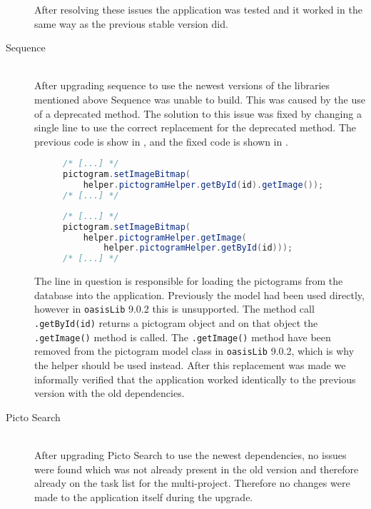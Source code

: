 \begin{description}
     After resolving these issues the application was tested and it worked in the same way as the previous stable version did. 
     \item[Sequence] \hfill \\ 
    After upgrading sequence to use the newest versions of the libraries mentioned above Sequence was unable to build. 
     This was caused by the use of a deprecated method. 
     The solution to this issue was fixed by changing a single line to use the correct replacement for the deprecated method. 
    The previous code is show in , and the fixed code is shown in . 
    \begin{figure} 
        \begin{lstlisting}[language=java, caption={Sequence with deprecated method call. }, label=lst:dep-seq-prev] 
/* [...] */ 
pictogram.setImageBitmap( 
    helper.pictogramHelper.getById(id).getImage()); 
/* [...] */ 
        \end{lstlisting} 
    \end{figure} 
    \begin{figure} 
        \begin{lstlisting}[language=java, caption={Sequence using the replacement code. }, label=lst:dep-seq-upd] 
/* [...] */ 
pictogram.setImageBitmap( 
    helper.pictogramHelper.getImage( 
        helper.pictogramHelper.getById(id))); 
/* [...] */ 
        \end{lstlisting} 
    \end{figure} 
    The line in question is responsible for loading the pictograms from the database into the application. 
    Previously the model had been used directly, however in \texttt{oasisLib} 9.0.2 this is unsupported. 
    The method call \texttt{.getById(id)} returns a pictogram object and on that object the \texttt{.getImage()} method is called. 
    The \texttt{.getImage()} method have been removed from the pictogram model class in \texttt{oasisLib} 9.0.2, which is why the helper should be used instead. 
    After this replacement was made we informally verified that the application worked identically to the previous version with the old dependencies. 
    \item[Picto Search] \hfill \\
    After upgrading Picto Search to use the newest dependencies, no issues were found which was not already present in the old version and therefore already on the task list for the multi-project. 
    Therefore no changes were made to the application itself during the upgrade. 
 \end{description}
 
